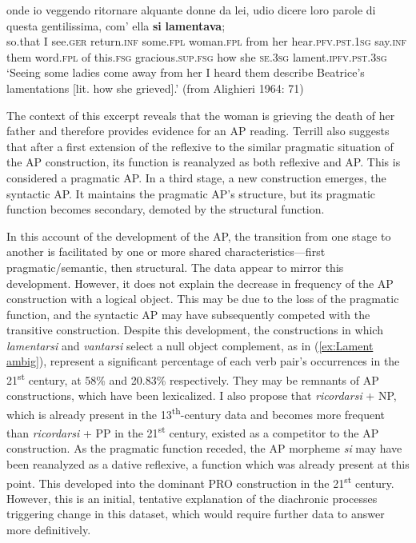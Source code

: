 \documentclass[output=paper,colorlinks,citecolor=brown]{langscibook}
\begin{document}
\begin{exe}
\ex \label{ex:Lament ambig}
    \gll [...] onde io veggendo ritornare alquante donne da lei, udio dicere loro parole di questa gentilissima, com' ella \textbf{si} \textbf{lamentava};\\
     [...] so.that I see.\textsc{ger} return.\textsc{inf} some.\textsc{fpl} woman.\textsc{fpl} from her hear.\textsc{pfv.pst.1sg} say.\textsc{inf} them word.\textsc{fpl} of this.\textsc{fsg} gracious.\textsc{sup.fsg} how she \textsc{se}.\textsc{3sg} lament.\textsc{ipfv.pst.3sg} \\ 
    \glt `Seeing some ladies come away from her I heard them describe Beatrice's lamentations [lit. how she grieved].' (from Alighieri 1964: 71)
\end{exe}

The context of this excerpt reveals that the woman is grieving the death of her father and therefore provides evidence for an AP reading. Terrill also suggests that after a first extension of the reflexive to the similar pragmatic situation of the AP construction, its function is reanalyzed as both reflexive and AP. This is considered a pragmatic AP. In a third stage, a new construction emerges, the syntactic AP. It maintains the pragmatic AP’s structure, but its pragmatic function becomes secondary, demoted by the structural function.

In this account of the development of the AP, the transition from one stage to another is facilitated by one or more shared characteristics—first pragmatic/semantic, then structural. The data appear to mirror this development. However, it does not explain the decrease in frequency of the AP construction with a logical object. This may be due to the loss of the pragmatic function, and the syntactic AP may have subsequently competed with the transitive construction. Despite this development, the constructions in which \textit{lamentarsi} and \textit{vantarsi} select a null object complement, as in (\ref{ex:Lament ambig}), represent a significant percentage of each verb pair’s occurrences in the 21\textsuperscript{st} century, at 58\% and 20.83\% respectively. They may be remnants of AP constructions, which have been lexicalized. I also propose that \textit{ricordarsi} + NP, which is already present in the 13\textsuperscript{th}-century data and becomes more frequent than \textit{ricordarsi} + PP in the 21\textsuperscript{st} century, existed as a competitor to the AP construction. As the pragmatic function receded, the AP morpheme \textit{si} may have been reanalyzed as a dative reflexive, a function which was already present at this point. This developed into the dominant PRO construction in the 21\textsuperscript{st} century. However, this is an initial, tentative explanation of the diachronic processes triggering change in this dataset, which would require further data to answer more definitively.
\end{document}
